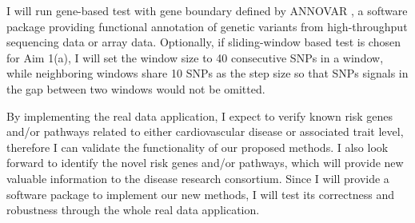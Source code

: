 \documentclass[12pt]{article}
\begin{document}
I will run gene-based test with gene boundary defined by ANNOVAR \cite{Wang2010a}, a software package providing functional annotation of genetic variants from high-throughput sequencing data or array data. Optionally, if sliding-window based test is chosen for Aim 1(a), I will set the window size to 40 consecutive SNPs in a window, while neighboring windows share 10 SNPs as the step size so that SNPs signals in the gap between two windows would not be omitted. 

By implementing the real data application, I expect to verify known risk genes and/or pathways related to either cardiovascular disease or associated trait level, therefore I can validate the functionality of our proposed methods. I also look forward to identify the novel risk genes and/or pathways, which will provide new valuable information to the disease research consortium. Since I will provide a software package to implement our new methods, I will test its correctness and robustness through the whole real data application.  



\end{document}
